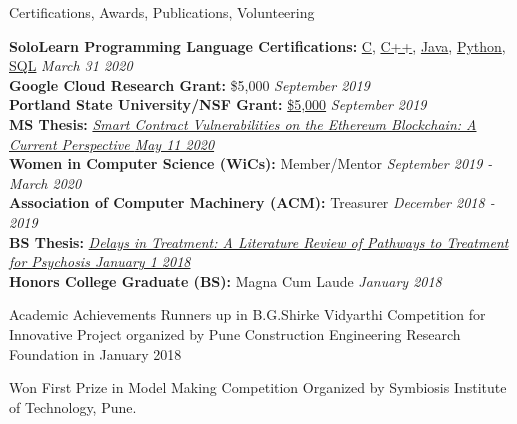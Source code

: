 \documentclass{resume} %
\begin{document}
\begin{rSection}{Certifications, Awards, Publications, Volunteering}

{\bf{SoloLearn Programming Language Certifications:}} 
  \href{https://www.sololearn.com/Certificate/1089-17953779/pdf/?mode=download}{C}, 
  \href{https://www.sololearn.com/Certificate/1051-17953779/pdf/?mode=download}{C++},
  \href{https://www.sololearn.com/Certificate/1068-17953779/pdf/?mode=download}{Java},
  \href{https://www.sololearn.com/Certificate/1073-17953779/pdf/?mode=download}{Python}, 
  \href{https://www.sololearn.com/Certificate/1060-17953779/pdf/?mode=download}{SQL} \hfill {\em{March 31 2020}}\\
{\bf{Google Cloud Research Grant:}} \$5,000 \hfill {\em{September 2019}}\\
  {\bf{Portland State University/NSF Grant:}} \href{https://www.nsf.gov/awardsearch/showAward?AWD\_ID=1821841}{\$5,000} \hfill {\em{September 2019}}\\
  {\bf{MS Thesis:}} \href{https://www.slideshare.net/DanielConnelly15/daniel-connelly-ethereum-smart-contract-masters-thesis}{\itshape{Smart Contract Vulnerabilities on the Ethereum Blockchain: A Current Perspective \hfill {\em{May 11 2020}}}}\\
  {\bf{Women in Computer Science (WiCs):}} Member/Mentor \hfill {\em{September 2019 - March 2020}}\\
  {\bf{Association of Computer Machinery (ACM):}} Treasurer \hfill {\em{December 2018 - 2019}}\\
  {\bf{BS Thesis:}} \href{https://pdxscholar.library.pdx.edu/honorstheses/496/}{\itshape{Delays in Treatment: A Literature Review of Pathways to Treatment for Psychosis \hfill{\em{January 1 2018}}}}\\
  {\bf{Honors College Graduate (BS):}} Magna Cum Laude \hfill {\em{January 2018}}\\

\end{rSection}






\iffalse
\begin{rSection}{Academic Achievements} 
 Runners up in B.G.Shirke Vidyarthi Competition for Innovative Project organized by Pune Construction Engineering Research Foundation in January 2018
\item Won First Prize in Model Making Competition Organized by Symbiosis Institute of Technology, Pune.
\end{rSection}
\end{document}
